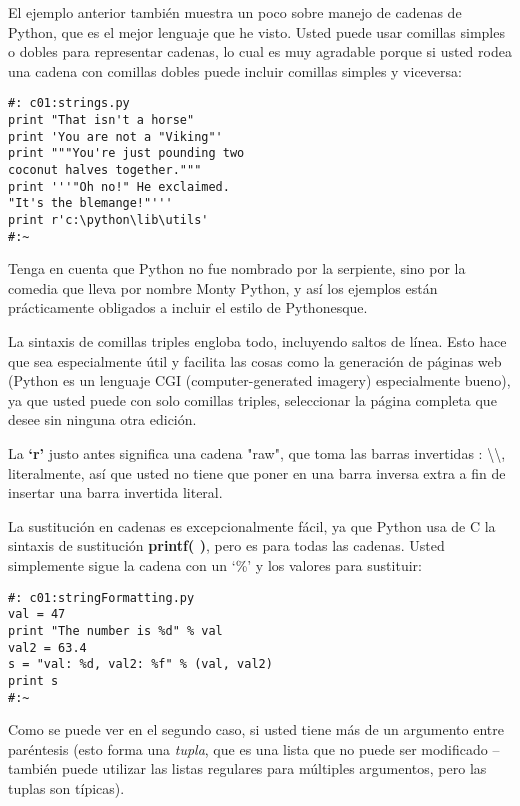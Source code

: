 El ejemplo anterior también muestra un poco sobre manejo de cadenas de Python, que es el mejor lenguaje que he visto. Usted puede usar comillas simples o dobles para representar cadenas, lo cual es muy agradable porque si usted rodea una cadena con comillas dobles puede incluir comillas simples y viceversa:
\newline

\begin{lstlisting}
#: c01:strings.py 
print "That isn't a horse" 
print 'You are not a "Viking"' 
print """You're just pounding two 
coconut halves together.""" 
print '''"Oh no!" He exclaimed. 
"It's the blemange!"''' 
print r'c:\python\lib\utils' 
#:~ 
\end{lstlisting}

Tenga en cuenta que Python no fue nombrado por la serpiente, sino por la comedia que lleva por nombre Monty Python, y así los ejemplos están prácticamente obligados a incluir el estilo de Pythonesque.\newline

La sintaxis de comillas triples engloba todo, incluyendo saltos de línea. Esto hace que sea especialmente útil y facilita las cosas como la generación de páginas web (Python es un lenguaje CGI (computer-generated imagery) especialmente bueno), ya que usted puede con solo comillas triples, seleccionar la página completa que desee sin ninguna otra edición. \newline

La \textbf{‘r’} justo antes significa una cadena "raw", que toma las barras invertidas : \textbackslash \textbackslash ,  literalmente, así que usted no tiene que poner en una barra inversa extra a fin de insertar una barra invertida literal.  \newline

La sustitución en cadenas es excepcionalmente fácil, ya que Python usa de C la sintaxis de sustitución \textbf{printf( )}, pero es para todas las cadenas. Usted simplemente sigue la cadena con un ‘\%’ y los valores para sustituir:
\newline

\begin{lstlisting}
#: c01:stringFormatting.py 
val = 47 
print "The number is %d" % val 
val2 = 63.4 
s = "val: %d, val2: %f" % (val, val2) 
print s 
#:~ 
\end{lstlisting}

Como se puede ver en el segundo caso, si usted tiene más de un argumento entre paréntesis (esto forma una \textit{tupla}, que es una lista que no puede ser modificado – también puede utilizar las listas regulares para múltiples argumentos, pero las tuplas son típicas).\newline

